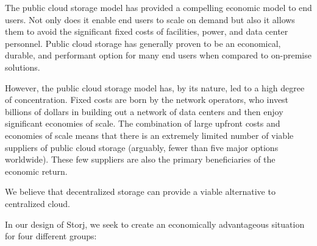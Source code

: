 \documentclass[11pt,fleqn,openany]{book}
\begin{document}
The public cloud storage model has provided a compelling economic model to end
users. Not only does it enable end users to scale on demand but also it allows them to avoid the significant fixed costs of facilities, power, and data center
personnel. Public cloud storage has generally proven to be an economical,
durable, and performant option for many end users when compared to
on-premise solutions.

However, the public cloud storage model has, by its nature, led to a high
degree of concentration. Fixed costs are born by the network operators, who
invest billions of dollars in building out a network of data centers and
then enjoy significant economies of scale. The combination of large upfront
costs and economies of scale means that there is an extremely limited number
of viable suppliers of public cloud storage (arguably, fewer than five major
options worldwide). These few suppliers are also the primary beneficiaries of
the economic return.

We believe that decentralized storage can provide a viable alternative to
centralized cloud.

In our design of Storj, we seek to create an economically advantageous
situation for four different groups:
\end{document}

